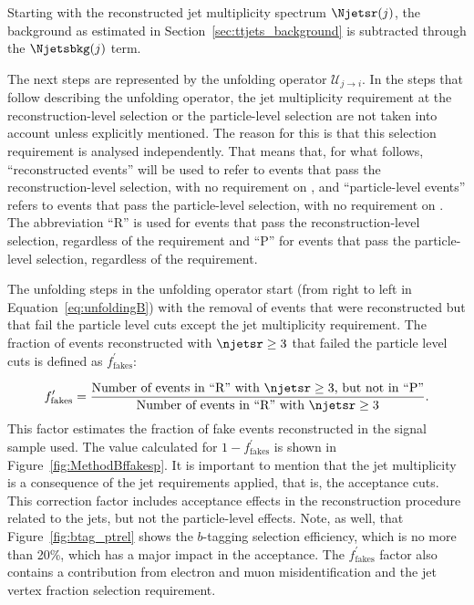 Starting with the reconstructed jet multiplicity spectrum
$\Njetsr (j)$, the background as estimated in
Section~\ref{sec:ttjets_background} is subtracted through the $\Njetsbkg (j)$
term.

The next steps are represented by the unfolding operator $\mathcal{U}_{j \rightarrow i}$.
In the steps that follow describing the unfolding operator,
the jet multiplicity requirement at the reconstruction-level selection or the particle-level
selection are not taken into account unless explicitly mentioned. The reason for this is that
this selection requirement is analysed independently. That means that, for what follows, ``reconstructed events'' will
be used to refer to events that pass the reconstruction-level selection, with no requirement on \njetsr, and
``particle-level events'' refers to events that pass the particle-level selection, with no requirement on \njetsp.
The abbreviation ``R'' is used for events that pass the reconstruction-level
selection, regardless of the \njetsr requirement and ``P'' for
events that pass the particle-level selection, regardless of the
\njetsp requirement.

The unfolding steps in the unfolding operator start (from right to left in Equation~\ref{eq:unfoldingB}) with
the removal of events that were reconstructed
but that fail the particle level cuts except the jet multiplicity
requirement.
The fraction of events reconstructed with
$\njetsr \geq 3$ that failed the particle level cuts is defined as
$f^{\prime}_{\mathrm{fakes}}$:

\begin{equation}
\displaystyle
f_{\textrm{fakes}}^{\prime} = \frac{\textrm{Number of events in ``R'' with } \njetsr \geq 3 \textrm{, but not in ``P''}}{\textrm{Number of events in ``R'' with } \njetsr \geq 3}.
\label{eq:ttjets_fpfakes}
\end{equation}
This factor estimates the fraction
of fake \ttbar events reconstructed in the signal sample used.
The value calculated for $1 - f^{\prime}_{\mathrm{fakes}}$ is shown in Figure~\ref{fig:MethodBffakesp}.
It is important to mention that the jet multiplicity is a consequence of the jet
requirements applied, that is, the acceptance cuts.
This correction factor includes acceptance effects in the reconstruction procedure related to the jets,
but not the particle-level effects. Note, as well, that Figure~\ref{fig:btag_ptrel} shows the $b$-tagging selection efficiency, which is
no more than 20\%, which has a major impact in the acceptance. The $f^{\prime}_{\mathrm{fakes}}$ factor also contains a contribution
from electron and muon misidentification and the jet vertex fraction selection requirement.

